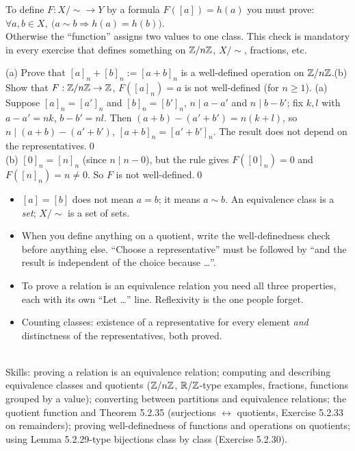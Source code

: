 \begin{key}
To define $F:X/{\sim}\to Y$ by a formula $F([a])=h(a)$ you must prove: \quad $\forall a,b\in X,\ \big(a\sim b\Rightarrow h(a)=h(b)\big)$.\\
Otherwise the ``function'' assigns two values to one class. This check is mandatory in every exercise that defines something on $\mathbb{Z}/n\mathbb{Z}$, $X/{\sim}$, fractions, etc.
\end{key}

\begin{hexample}
(a) Prove that $[a]_n+[b]_n:=[a+b]_n$ is a well-defined operation on $\mathbb{Z}/n\mathbb{Z}$.\quad (b) Show that $F:\mathbb{Z}/n\mathbb{Z}\to\mathbb{Z}$, $F([a]_n)=a$ is not well-defined (for $n\ge1$).
\solution
(a) Suppose $[a]_n=[a']_n$ and $[b]_n=[b']_n$, \ie $n\mid a-a'$ and $n\mid b-b'$; fix $k,l$ with $a-a'=nk$, $b-b'=nl$. Then $(a+b)-(a'+b')=n(k+l)$, so $n\mid(a+b)-(a'+b')$, \ie $[a+b]_n=[a'+b']_n$. The result does not depend on the representatives.\qed\\
(b) $[0]_n=[n]_n$ (since $n\mid n-0$), but the rule gives $F([0]_n)=0$ and $F([n]_n)=n\neq0$. So $F$ is not well-defined.\qed
\end{hexample}

\begin{warn}
\begin{itemize}
\item $[a]=[b]$ does not mean $a=b$; it means $a\sim b$. An equivalence class is a \emph{set}; $X/{\sim}$ is a set of sets.
\item When you define anything on a quotient, write the well-definedness check before anything else. ``Choose a representative'' must be followed by ``and the result is independent of the choice because \dots''.
\item To prove a relation is an equivalence relation you need all three properties, each with its own ``Let \dots'' line. Reflexivity is the one people forget.
\item Counting classes: existence of a representative for every element \emph{and} distinctness of the representatives, both proved.
\end{itemize}
\end{warn}

\begin{planning}[5.2 and 5.E]
\quad {}\\[3pt]
Skills: proving a relation is an equivalence relation; computing and describing equivalence classes and quotients ($\mathbb{Z}/n\mathbb{Z}$, $\mathbb{R}/\mathbb{Z}$-type examples, fractions, functions grouped by a value); converting between partitions and equivalence relations; the quotient function and Theorem 5.2.35 (surjections $\leftrightarrow$ quotients, Exercise 5.2.33 on remainders); proving well-definedness of functions and operations on quotients; using Lemma 5.2.29-type bijections class by class (Exercise 5.2.30).
\end{planning}

